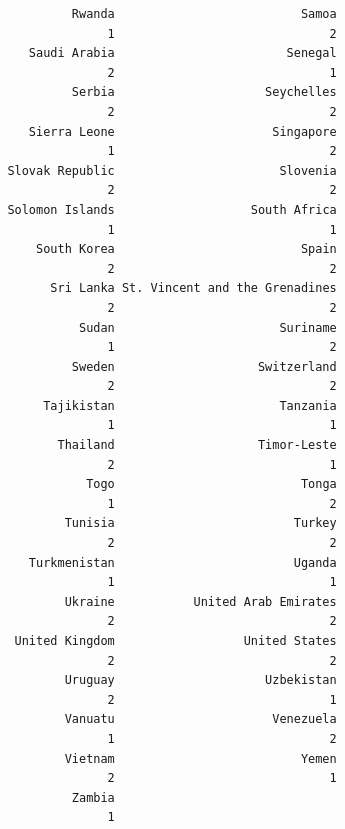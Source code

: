 \documentclass[
]{article}
\begin{document}
\begin{verbatim}
                        Rwanda                          Samoa 
                             1                              2 
                  Saudi Arabia                        Senegal 
                             2                              1 
                        Serbia                     Seychelles 
                             2                              2 
                  Sierra Leone                      Singapore 
                             1                              2 
               Slovak Republic                       Slovenia 
                             2                              2 
               Solomon Islands                   South Africa 
                             1                              1 
                   South Korea                          Spain 
                             2                              2 
                     Sri Lanka St. Vincent and the Grenadines 
                             2                              2 
                         Sudan                       Suriname 
                             1                              2 
                        Sweden                    Switzerland 
                             2                              2 
                    Tajikistan                       Tanzania 
                             1                              1 
                      Thailand                    Timor-Leste 
                             2                              1 
                          Togo                          Tonga 
                             1                              2 
                       Tunisia                         Turkey 
                             2                              2 
                  Turkmenistan                         Uganda 
                             1                              1 
                       Ukraine           United Arab Emirates 
                             2                              2 
                United Kingdom                  United States 
                             2                              2 
                       Uruguay                     Uzbekistan 
                             2                              1 
                       Vanuatu                      Venezuela 
                             1                              2 
                       Vietnam                          Yemen 
                             2                              1 
                        Zambia 
                             1 
\end{verbatim}
\end{document}
